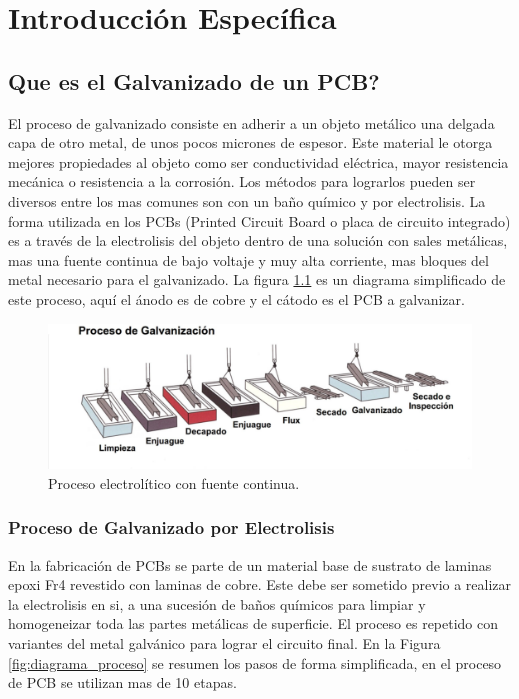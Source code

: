\chapter{ Introducción Específica } %
\section{ Que es el Galvanizado de un PCB? }

El proceso de galvanizado consiste en adherir a un objeto metálico una delgada capa de otro metal, de unos pocos micrones de espesor. Este material le otorga mejores propiedades al objeto como ser conductividad eléctrica, mayor resistencia mecánica o resistencia a la corrosión. 
Los métodos para lograrlos pueden ser diversos entre los mas comunes son con un baño químico y por electrolisis.
La forma utilizada en los PCBs (Printed Circuit Board o placa de circuito integrado) es a través de la electrolisis del objeto dentro de una solución con sales metálicas, mas una fuente continua de bajo voltaje y muy alta corriente, mas bloques del metal necesario para el galvanizado. 
La figura \ref{fig:galvanizado_electrolitico} es un diagrama simplificado de este proceso, aquí el ánodo es de cobre y el cátodo es el PCB a galvanizar.

\begin{figure}[h]
	\centering
	\includegraphics[width=.9\textwidth]{Figures/Cap_2/diagrama_galvanizado_basico}
	\caption{Proceso electrolítico con fuente continua.}
	\label{fig:galvanizado_electrolitico}
\end{figure}


\subsection{ Proceso de Galvanizado por Electrolisis }

En la fabricación de PCBs se parte de un material base de sustrato de laminas epoxi Fr4 revestido con laminas de cobre. Este debe ser sometido previo a realizar la electrolisis en si, a una sucesión de baños químicos para limpiar y homogeneizar toda las partes metálicas de superficie. El proceso es repetido con variantes del metal galvánico para lograr el circuito final. 
En la Figura \ref{fig:diagrama_proceso} se resumen los pasos de forma simplificada, en el proceso de PCB se utilizan mas de 10 etapas. 

